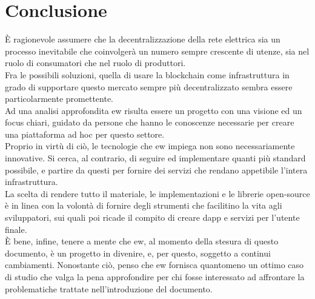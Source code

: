 \chapter*{Conclusione}
È ragionevole assumere che la decentralizzazione della rete elettrica sia un processo inevitabile che coinvolgerà un numero sempre crescente di utenze, 
sia nel ruolo di consumatori che nel ruolo di produttori. \\

Fra le possibili soluzioni, quella di usare la blockchain come infrastruttura in grado di supportare questo mercato sempre più decentralizzato sembra essere particolarmente promettente. \\
Ad una analisi approfondita \gls{ew} risulta essere un progetto con una visione ed un focus chiari, guidato da persone che hanno le conoscenze necessarie per creare una piattaforma ad hoc per questo settore. \\
Proprio in virtù di ciò, le tecnologie che \gls{ew} impiega non sono necessariamente innovative.
Si cerca, al contrario, di seguire ed implementare quanti più standard possibile, e partire da questi per fornire dei servizi che rendano appetibile l'intera infrastruttura. \\
La scelta di rendere tutto il materiale, le implementazioni e le librerie open-source è in linea con la volontà di fornire degli strumenti che facilitino la vita agli sviluppatori, 
sui quali poi ricade il compito di creare \gls{dapp} e servizi per l'utente finale. \\
È bene, infine, tenere a mente che \gls{ew}, al momento della stesura di questo documento, è un progetto in divenire, e, per questo, soggetto a continui cambiamenti.
Nonostante ciò, penso che \gls{ew} fornisca quantomeno un ottimo caso di studio che valga la pena approfondire per chi fosse interessato ad affrontare la problematiche trattate nell'introduzione del documento.
